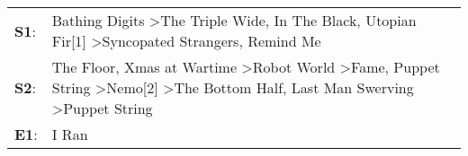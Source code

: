 \begin{supertabular}{p{0.03\textwidth}p{0.92\textwidth}}
 \textbf{S1}:  &                                                                                                                                                 Bathing Digits\textsuperscript{} \textgreater \enspace The Triple Wide\textsuperscript{}, \enspace In The Black\textsuperscript{}, \enspace Utopian Fir[1]\textsuperscript{} \textgreater \enspace Syncopated Strangers\textsuperscript{}, \enspace Remind Me\textsuperscript{}  \enspace  \\
 \textbf{S2}:  &  The Floor\textsuperscript{}, \enspace Xmas at Wartime\textsuperscript{} \textgreater \enspace Robot World\textsuperscript{} \textgreater \enspace Fame\textsuperscript{}, \enspace Puppet String\textsuperscript{} \textgreater \enspace Nemo[2]\textsuperscript{} \textgreater \enspace The Bottom Half\textsuperscript{}, \enspace Last Man Swerving\textsuperscript{} \textgreater \enspace Puppet String\textsuperscript{}  \enspace  \\
 \textbf{E1}:  &                                                                                                                                                                                                                                                                                                                                                                                                         I Ran\textsuperscript{}  \enspace  \\
\end{supertabular}
